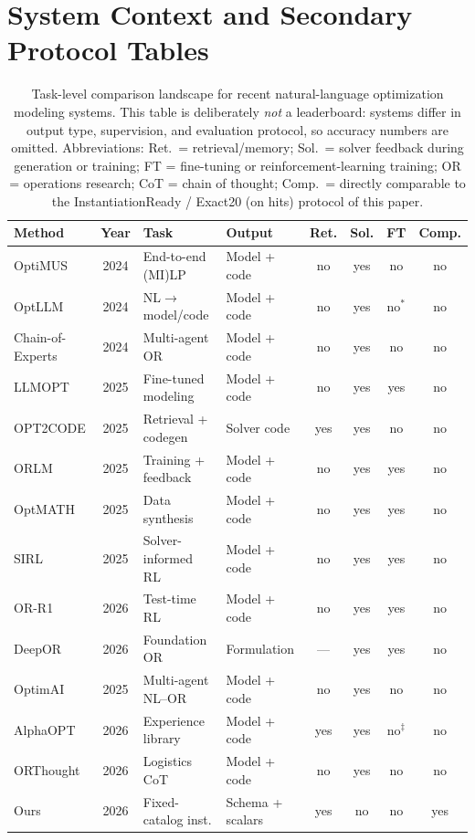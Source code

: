 \documentclass[pdflatex,sn-basic,Numbered]{sn-jnl}
\renewcommand{\arraystretch}{1.18}
\begin{document}
\section{System Context and Secondary Protocol Tables}
\begin{table}[htbp]
\centering
\caption{Task-level comparison landscape for recent natural-language optimization modeling systems.
This table is deliberately \emph{not} a leaderboard: systems differ in output type, supervision, and
evaluation protocol, so accuracy numbers are omitted. Abbreviations: Ret.\ = retrieval/memory;
Sol.\ = solver feedback during generation or training; FT = fine-tuning or reinforcement-learning training; OR = operations research; CoT = chain of thought;
Comp.\ = directly comparable
to the InstantiationReady / Exact20 (on hits) protocol of this paper.}
\label{tab:comparison_landscape}
\small
\setlength{\tabcolsep}{2.4pt}
\renewcommand{\arraystretch}{1.12}
\begin{tabularx}{\linewidth}{@{}>{\raggedright\arraybackslash}p{2.6cm}c>{\raggedright\arraybackslash}p{2.6cm}Xcccc@{}}
\toprule
Method & Year & Task & Output & Ret. & Sol. & FT & Comp. \\
\midrule
OptiMUS & 2024 & End-to-end (MI)LP & Model + code & no & yes & no & no \\
OptLLM & 2024 & NL$\rightarrow$model/code & Model + code & no & yes & no$^{*}$ & no \\
Chain-of-Experts & 2024 & Multi-agent OR & Model + code & no & yes & no & no \\
LLMOPT & 2025 & Fine-tuned modeling & Model + code & no & yes & yes & no \\
OPT2CODE & 2025 & Retrieval + codegen & Solver code & yes & yes & no & no \\
ORLM & 2025 & Training + feedback & Model + code & no & yes & yes & no \\
OptMATH & 2025 & Data synthesis & Model + code & no & yes & yes & no \\
SIRL & 2025 & Solver-informed RL & Model + code & no & yes & yes & no \\
OR-R1 & 2026 & Test-time RL & Model + code & no & yes & yes & no \\
DeepOR & 2026 & Foundation OR & Formulation & --- & yes & yes & no \\
OptimAI & 2025 & Multi-agent NL--OR & Model + code & no & yes & no & no \\
AlphaOPT & 2026 & Experience library & Model + code & yes & yes & no$^{\ddagger}$ & no \\
ORThought & 2026 & Logistics CoT & Model + code & no & yes & no & no \\
Ours & 2026 & Fixed-catalog inst. & Schema + scalars & yes & no & no & yes \\
\bottomrule
\end{tabularx}


\end{table}
\end{document}
